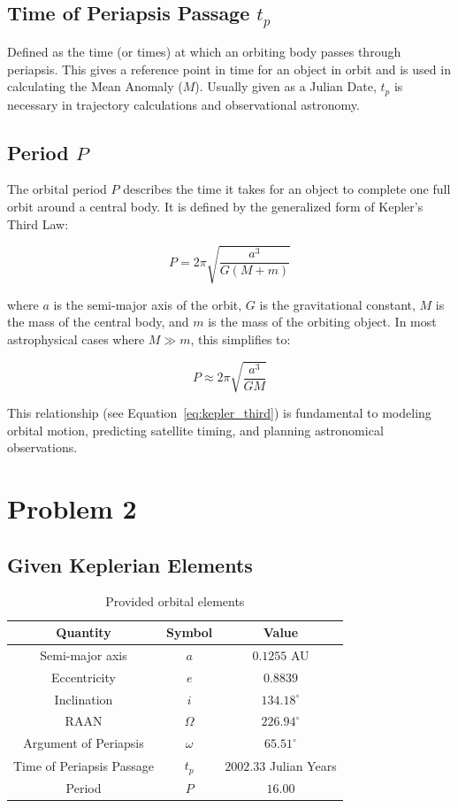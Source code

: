 \documentclass[linenumbers,trackchanges,astrosymb,]{aastex7}
\begin{document}
\subsection{Time of Periapsis Passage $t_p$}  
Defined as the time (or times) at which an orbiting body passes through periapsis. This gives a reference point in time for an object in orbit and is used in calculating the Mean Anomaly ($M$). Usually given as a Julian Date, $t_p$ is necessary in trajectory calculations and observational astronomy. 

\subsection{Period $P$}

The orbital period $P$ describes the time it takes for an object to complete one full orbit around a central body. It is defined by the generalized form of Kepler's Third Law:

\begin{equation}
P = 2\pi \sqrt{\frac{a^3}{G(M + m)}}
\label{eq:kepler_third}
\end{equation}

where $a$ is the semi-major axis of the orbit, $G$ is the gravitational constant, $M$ is the mass of the central body, and $m$ is the mass of the orbiting object. In most astrophysical cases where $M \gg m$, this simplifies to:

\begin{equation}
P \approx 2\pi \sqrt{\frac{a^3}{GM}}
\label{eq:kepler_simplified}
\end{equation}

This relationship (see Equation~\ref{eq:kepler_third}) is fundamental to modeling orbital motion, predicting satellite timing, and planning astronomical observations.


\section{Problem 2}

\subsection{Given Keplerian Elements}
\begin{table}[h]
  \centering
  \begin{tabular}{|c|c|c|}
    \hline
    Quantity & Symbol & Value \\
    \hline
    Semi-major axis & $a$ & $0.1255$ AU \\
    Eccentricity & $e$ & $0.8839$ \\
    Inclination & $i$ & $134.18^\circ$ \\
    RAAN & $\Omega$ & $226.94^\circ$ \\
    Argument of Periapsis & $\omega$ & $65.51^\circ$ \\
    Time of Periapsis Passage & $t_p$ & $2002.33$ Julian Years \\
    Period & $P$ & $16.00$ \\
    \hline
  \end{tabular}
  \caption{Provided orbital elements}
  \label{tab:orbit}
\end{table}
\end{document}
